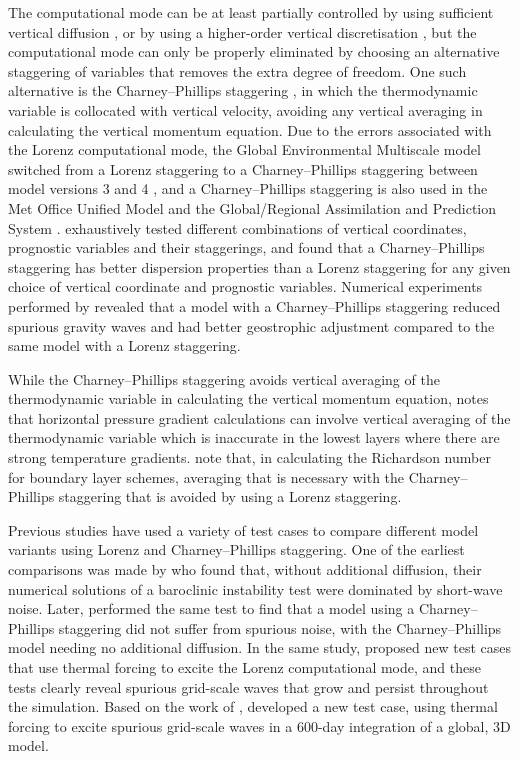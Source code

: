 The computational mode can be at least partially controlled by using sufficient vertical diffusion \citep{chang1992,zadra2004}, or by using a higher-order vertical discretisation \citep{untch-hortal2004,guerra-ullrich2016,yi-park2017}, but the computational mode can only be properly eliminated by choosing an alternative staggering of variables that removes the extra degree of freedom.
One such alternative is the Charney--Phillips staggering \citep{charney-phillips1953}, in which the thermodynamic variable is collocated with vertical velocity, avoiding any vertical averaging in calculating the vertical momentum equation.
Due to the errors associated with the Lorenz computational mode, the Global Environmental Multiscale model switched from a Lorenz staggering to a Charney--Phillips staggering between model versions 3 and 4 \citep{girard2014}, and a Charney--Phillips staggering is also used in the Met Office Unified Model \citep{davies2005} and the Global/Regional Assimilation and Prediction System \citep{yang2007}.
\citet{thuburn-woolings2005} exhaustively tested different combinations of vertical coordinates, prognostic variables and their staggerings, and found that a Charney--Phillips staggering has better dispersion properties than a Lorenz staggering for any given choice of vertical coordinate and prognostic variables.
Numerical experiments performed by \citet{cullen1997} revealed that a model with a Charney--Phillips staggering reduced spurious gravity waves and had better geostrophic adjustment compared to the same model with a Lorenz staggering.

While the Charney--Phillips staggering avoids vertical averaging of the thermodynamic variable in calculating the vertical momentum equation, \citet{davies2005} notes that horizontal pressure gradient calculations can involve vertical averaging of the thermodynamic variable which is inaccurate in the lowest layers where there are strong temperature gradients.
\citet{holdaway2013a} note that, in calculating the Richardson number for boundary layer schemes, averaging that is necessary with the Charney--Phillips staggering that is avoided by using a Lorenz staggering.

Previous studies have used a variety of test cases to compare different model variants using Lorenz and Charney--Phillips staggering.
One of the earliest comparisons was made by \citet{arakawa-moorthi1988} who found that, without additional diffusion, their numerical solutions of a baroclinic instability test were dominated by short-wave noise.
Later, \citet{arakawa-konor1996} performed the same test to find that a model using a Charney--Phillips staggering did not suffer from spurious noise, with the Charney--Phillips model needing no additional diffusion.
In the same study, \citet{arakawa-konor1996} proposed new test cases that use thermal forcing to excite the Lorenz computational mode, and these tests clearly reveal spurious grid-scale waves that grow and persist throughout the simulation.
Based on the work of \citet{arakawa-konor1996}, \citet{untch-hortal2004} developed a new test case, using thermal forcing to excite spurious grid-scale waves in a 600-day integration of a global, 3D model.

